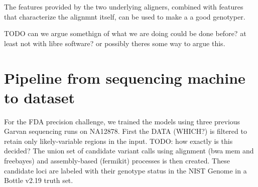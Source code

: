\documentclass{article}
\begin{document}
The features provided by the two underlying aligners, combined with features that characterize the alignmnt itself, can be used to make a a good genotyper.




TODO can we argue somethign of what we are doing could be done before? at least not with libre software? or possibly theres some way to argue this.










\section{Pipeline from sequencing machine to dataset}



For the FDA precision challenge, we trained the models using three previous Garvan sequencing runs on NA12878.
First the DATA (WHICH?) is filtered to retain only likely-variable regions in the input. TODO: how exactly is this decided?
The union set of candidate variant calls using alignment (bwa mem and freebayes) and assembly-based (fermikit) processes is then created.
These candidate loci are labeled with their genotype status in the NIST Genome in a Bottle v2.19 truth set. 
\end{document}
